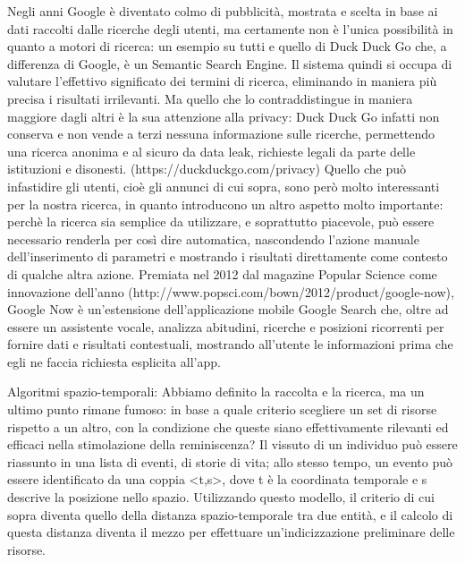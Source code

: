 \documentclass[sigproc-sp.tex]{subfiles}
\begin{document}
Negli anni Google è diventato colmo di pubblicità, mostrata e scelta in base ai dati raccolti dalle ricerche degli utenti, ma certamente non è l’unica possibilità in quanto a motori di ricerca: un esempio su tutti e quello di Duck Duck Go che, a differenza di Google, è un Semantic Search Engine. Il sistema quindi si occupa di valutare l’effettivo significato dei termini di ricerca, eliminando in maniera più precisa i risultati irrilevanti. Ma quello che lo contraddistingue in maniera maggiore dagli altri è la sua attenzione alla privacy: Duck Duck Go infatti non conserva e non vende a terzi nessuna informazione sulle ricerche, permettendo una ricerca anonima e al sicuro da data leak, richieste legali da parte delle istituzioni e disonesti. (https://duckduckgo.com/privacy)
Quello che può infastidire gli utenti, cioè gli annunci di cui sopra, sono però molto interessanti per la nostra ricerca, in quanto introducono un altro aspetto molto importante: perchè la ricerca sia semplice da utilizzare, e soprattutto piacevole, può essere necessario renderla per così dire automatica, nascondendo l’azione manuale dell’inserimento di parametri e mostrando i risultati direttamente come contesto di qualche altra azione. Premiata nel 2012 dal magazine Popular Science come innovazione dell’anno (http://www.popsci.com/bown/2012/product/google-now), Google Now è un’estensione dell’applicazione mobile Google Search che, oltre ad essere un assistente vocale, analizza abitudini, ricerche e posizioni ricorrenti per fornire dati e risultati contestuali, mostrando all’utente le informazioni prima che egli ne faccia richiesta esplicita all’app.

Algoritmi spazio-temporali: Abbiamo definito la raccolta e la ricerca, ma un ultimo punto rimane fumoso: in base a quale criterio scegliere un set di risorse rispetto a un altro, con la condizione che queste siano effettivamente rilevanti ed efficaci nella stimolazione della reminiscenza? Il vissuto di un individuo può essere riassunto in una lista di eventi, di storie di vita; allo stesso tempo, un evento può essere identificato da una coppia <t,s>, dove t è la coordinata temporale e s descrive la posizione nello spazio. Utilizzando questo modello, il criterio di cui sopra diventa quello della distanza spazio-temporale tra due entità, e il calcolo di questa distanza diventa il mezzo per effettuare un’indicizzazione preliminare delle risorse.
\end{document}
